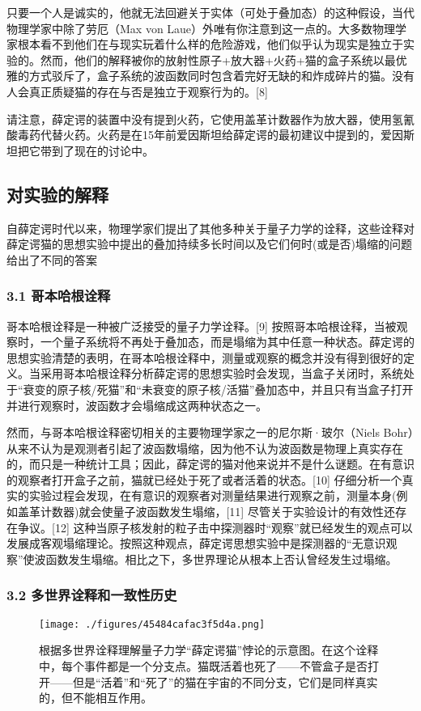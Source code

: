只要一个人是诚实的，他就无法回避关于实体（可处于叠加态）的这种假设，当代物理学家中除了劳厄（Max von Laue）外唯有你注意到这一点的。大多数物理学家根本看不到他们在与现实玩着什么样的危险游戏，他们似乎认为现实是独立于实验的。然而，他们的解释被你的放射性原子+放大器+火药+猫的盒子系统以最优雅的方式驳斥了，盒子系统的波函数同时包含着完好无缺的和炸成碎片的猫。没有人会真正质疑猫的存在与否是独立于观察行为的。[8]

请注意，薛定谔的装置中没有提到火药，它使用盖革计数器作为放大器，使用氢氰酸毒药代替火药。火药是在15年前爱因斯坦给薛定谔的最初建议中提到的，爱因斯坦把它带到了现在的讨论中。

\subsection{对实验的解释}
自薛定谔时代以来，物理学家们提出了其他多种关于量子力学的诠释，这些诠释对薛定谔猫的思想实验中提出的叠加持续多长时间以及它们何时(或是否)塌缩的问题给出了不同的答案

\subsubsection{3.1 哥本哈根诠释}
哥本哈根诠释是一种被广泛接受的量子力学诠释。[9] 按照哥本哈根诠释，当被观察时，一个量子系统将不再处于叠加态，而是塌缩为其中任意一种状态。薛定谔的思想实验清楚的表明，在哥本哈根诠释中，测量或观察的概念并没有得到很好的定义。当采用哥本哈根诠释分析薛定谔的思想实验时会发现，当盒子关闭时，系统处于“衰变的原子核/死猫”和“未衰变的原子核/活猫”叠加态中，并且只有当盒子打开并进行观察时，波函数才会塌缩成这两种状态之一。

然而，与哥本哈根诠释密切相关的主要物理学家之一的尼尔斯·玻尔（Niels Bohr）从来不认为是观测者引起了波函数塌缩，因为他不认为波函数是物理上真实存在的，而只是一种统计工具；因此，薛定谔的猫对他来说并不是什么谜题。在有意识的观察者打开盒子之前，猫就已经处于死了或者活着的状态。[10] 仔细分析一个真实的实验过程会发现，在有意识的观察者对测量结果进行观察之前，测量本身(例如盖革计数器)就会使量子波函数发生塌缩，[11] 尽管关于实验设计的有效性还存在争议。[12] 这种当原子核发射的粒子击中探测器时“观察”就已经发生的观点可以发展成客观塌缩理论。按照这种观点，薛定谔思想实验中是探测器的“无意识观察”使波函数发生塌缩。相比之下，多世界理论从根本上否认曾经发生过塌缩。

\subsubsection{3.2 多世界诠释和一致性历史}
\begin{figure}[ht]
\centering
\texttt{[image: ./figures/45484cafac3f5d4a.png]}
\caption{根据多世界诠释理解量子力学“薛定谔猫”悖论的示意图。在这个诠释中，每个事件都是一个分支点。猫既活着也死了——不管盒子是否打开——但是“活着”和“死了”的猫在宇宙的不同分支，它们是同样真实的，但不能相互作用。} \label{fig_XDEDM_4}
\end{figure}

